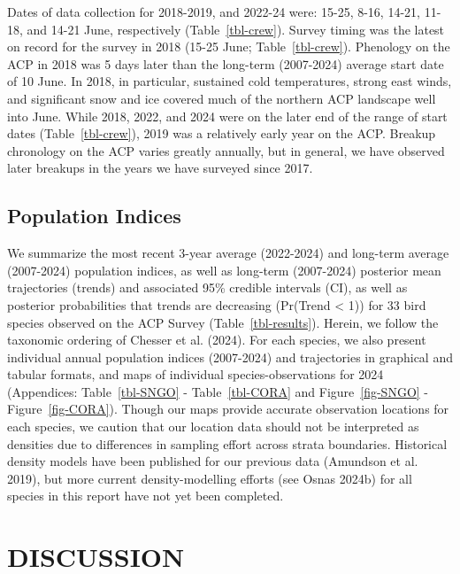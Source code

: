 \documentclass[
]{article}
\begin{document}
Dates of data collection for 2018-2019, and 2022-24 were: 15-25, 8-16,
14-21, 11-18, and 14-21 June, respectively (Table~\ref{tbl-crew}).
Survey timing was the latest on record for the survey in 2018 (15-25
June; Table~\ref{tbl-crew}). Phenology on the ACP in 2018 was 5 days
later than the long-term (2007-2024) average start date of 10 June. In
2018, in particular, sustained cold temperatures, strong east winds, and
significant snow and ice covered much of the northern ACP landscape well
into June. While 2018, 2022, and 2024 were on the later end of the range
of start dates (Table~\ref{tbl-crew}), 2019 was a relatively early year
on the ACP. Breakup chronology on the ACP varies greatly annually, but
in general, we have observed later breakups in the years we have
surveyed since 2017.

\subsection*{Population Indices}\label{population-indices-1}

We summarize the most recent 3-year average (2022-2024) and long-term
average (2007-2024) population indices, as well as long-term (2007-2024)
posterior mean trajectories (trends) and associated 95\% credible
intervals (CI), as well as posterior probabilities that trends are
decreasing (Pr(Trend \textless{} 1)) for 33 bird species observed on the
ACP Survey (Table~\ref{tbl-results}). Herein, we follow the taxonomic
ordering of Chesser et al. (2024). For each species, we also present
individual annual population indices (2007-2024) and trajectories in
graphical and tabular formats, and maps of individual
species-observations for 2024 (Appendices: Table~\ref{tbl-SNGO} -
Table~\ref{tbl-CORA} and Figure~\ref{fig-SNGO} - Figure~\ref{fig-CORA}).
Though our maps provide accurate observation locations for each species,
we caution that our location data should not be interpreted as densities
due to differences in sampling effort across strata boundaries.
Historical density models have been published for our previous data
(Amundson et al. 2019), but more current density-modelling efforts (see
Osnas 2024b) for all species in this report have not yet been completed.

\section*{DISCUSSION}\label{discussion}
\end{document}
